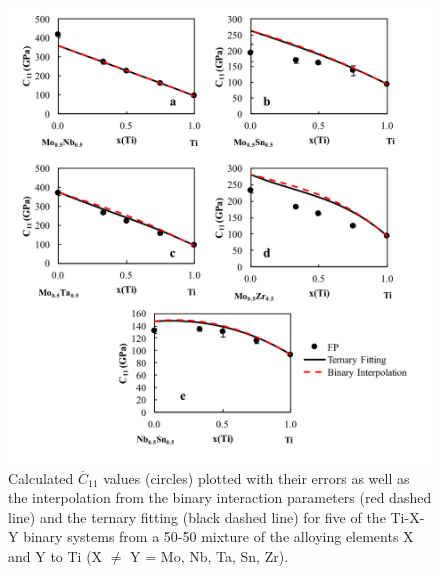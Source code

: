 \pagebreak
\begin{figure}[H]
	\centering
	\includegraphics[width=\textwidth]{Chapter-6/Figures/tixyc111.png}
	\caption{Calculated $\overline{C}_{11}$ values (circles) plotted with their errors as well as the interpolation from the binary interaction parameters (red dashed line) and the ternary fitting (black dashed line) for five of the Ti-X-Y binary systems from a 50-50 mixture of the alloying elements X and Y to Ti (X $\neq$ Y = Mo, Nb, Ta, Sn, Zr).}
	\label{Ch6-figure:tixyc11_1}
\end{figure}

